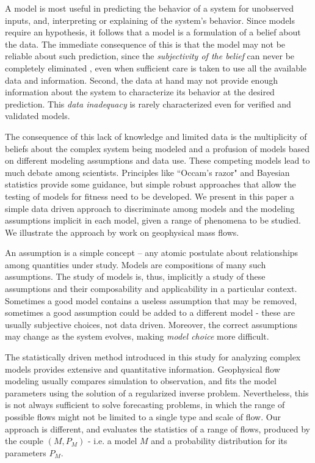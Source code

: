 \documentclass{article}
\begin{document}
A model is most useful in predicting the behavior of a system for unobserved inputs, and, interpreting or explaining of the system's behavior. Since models require an hypothesis, it follows  that a model is a formulation of a belief about the data. The immediate consequence of this is that the model may not be reliable about such prediction, since the {\it subjectivity of the belief} can never be completely eliminated \citep{Kennedy2001, Higdon2004}, even when sufficient care is taken to use all the available data and information. Second, the data at hand may not provide enough information about the system to characterize its behavior at the desired prediction. This {\it data inadequacy} is rarely characterized even for verified and validated models. %

The consequence of this lack of knowledge and limited data is the multiplicity of beliefs about the complex system being modeled and a profusion of models based on different modeling assumptions and data use. These competing models lead to much debate among scientists. Principles like ``Occam's razor" and Bayesian statistics \citep{Farrell2015} provide some guidance, but simple robust approaches that allow the testing of models for fitness need to be developed. We present in this paper a simple data driven approach to discriminate among models and the modeling assumptions implicit in each model, given a range of phenomena to be studied. We illustrate the approach by work on geophysical mass flows.


An assumption is a simple concept -- any atomic postulate about relationships among quantities under study. Models are compositions of many such assumptions. The study of models is, thus, implicitly a study of these assumptions and their composability and applicability in a particular context. Sometimes a good model contains a useless assumption that may be removed, sometimes a good assumption could be added to a different model - these are usually subjective choices, not data driven. Moreover, the correct assumptions may change as the system evolves, making {\em model choice} more difficult.


The statistically driven method introduced in this study for analyzing complex models provides extensive and quantitative information. Geophysical flow modeling usually compares simulation to observation, and fits the model parameters using the solution of a regularized inverse problem. Nevertheless, this is not always sufficient to solve forecasting problems, in which the range of possible flows might not be limited to a single type and scale of flow. Our approach is different, and evaluates the statistics of a range of flows, produced by the couple $\left(M, P_M\right)$ - i.e. a model $M$ and a probability distribution for its parameters $P_M$.
\end{document}
